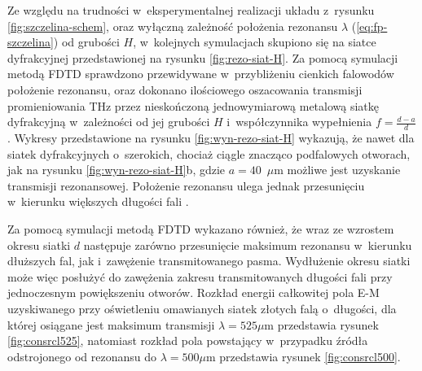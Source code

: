 Ze względu na trudności w~eksperymentalnej realizacji układu z~rysunku \ref{fig:szczelina-schem}, oraz wyłączną zależność położenia rezonansu $\lambda$ (\ref{eq:fp-szczelina}) od grubości $H$, w~kolejnych symulacjach skupiono się na siatce dyfrakcyjnej przedstawionej na rysunku \ref{fig:rezo-siat-H}.  Za pomocą symulacji metodą FDTD sprawdzono przewidywane w~przybliżeniu cienkich falowodów położenie rezonansu, oraz dokonano ilościowego oszacowania transmisji promieniowania THz przez nieskończoną jednowymiarową metalową siatkę dyfrakcyjną w~zależności od jej grubości $H$ i~współczynnika wypełnienia $f=\frac{d-a}{d}$. Wykresy przedstawione na rysunku \ref{fig:wyn-rezo-siat-H} wykazują, że nawet dla siatek dyfrakcyjnych o~szerokich, chociaż ciągle znacząco podfalowych otworach, jak na rysunku \ref{fig:wyn-rezo-siat-H}b, gdzie $a=40$~$\mu$m możliwe jest uzyskanie transmisji rezonansowej. Położenie rezonansu ulega jednak przesunięciu w~kierunku większych długości fali \cite{Szczytko2012271}.

Za pomocą symulacji metodą FDTD wykazano również, że wraz ze wzrostem okresu siatki $d$ następuje zarówno przesunięcie maksimum rezonansu w~kierunku dłuższych fal, jak i~zawężenie transmitowanego pasma. Wydłużenie okresu siatki może więc posłużyć do zawężenia zakresu transmitowanych długości fali przy jednoczesnym powiększeniu otworów. Rozkład energii całkowitej pola E-M uzyskiwanego przy oświetleniu omawianych siatek złotych falą o~długości, dla której osiągane jest maksimum transmisji $\lambda=525 \mu$m przedstawia rysunek \ref{fig:consrcl525}, natomiast rozkład pola powstający w~przypadku źródła odstrojonego od rezonansu do $\lambda=500\mu$m przedstawia rysunek \ref{fig:consrcl500}.

